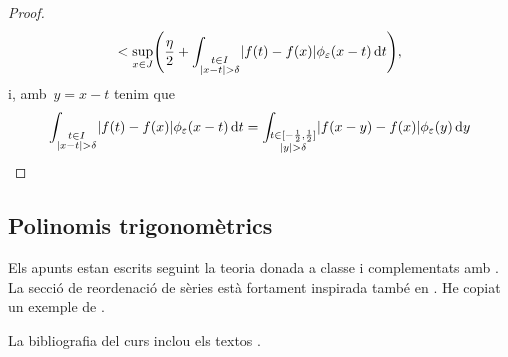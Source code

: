 \documentclass[../../main.tex]{subfiles}
\begin{document}
\begin{theorem}
\begin{proof}
\begin{multline*}
                 <\sup_{x\in J}\left(\frac{\eta}{2}+\int_{\substack{t\in I\\\abs{x-t}>\delta}}\abs{f(t)-f(x)}\phi_{\varepsilon}(x-t)\diff t\right), \hfill
             \end{multline*}
             i, amb~\(y=x-t\) tenim que %
             \[
                 \int_{\substack{t\in I\\\abs{x-t}>\delta}}\abs{f(t)-f(x)}\phi_{\varepsilon}(x-t)\diff t=\int_{\substack{t\in[-\frac{1}{2},\frac{1}{2}]\\\abs{y}>\delta}}\abs{f(x-y)-f(x)}\phi_{\varepsilon}(y)\diff y
             \]
        \end{proof}
    \end{theorem}
    \subsection{Polinomis trigonomètrics}
    \begin{definition}

    \end{definition}
    \printbibliography
    Els apunts estan escrits seguint la teoria donada a classe i complementats amb \cite{ApuntsMorelo}.
    La secció de reordenació de sèries està fortament inspirada també en \cite{HickmanRiemannSeriesTheoremNotes}.
    He copiat un exemple de \cite{KeithDifferentiatingUnderIntegralSignNotes}.

    La bibliografia del curs inclou els textos \cite{GalindoGuiaPracticaCalculoInfinitesimal,OrtegaIntroduccioAnalisiMatematica,PerelloCalculInfinitesimal,RudinPrinciplesOfMathematicalAnalysis,TolstovFourier}.
\end{document}
